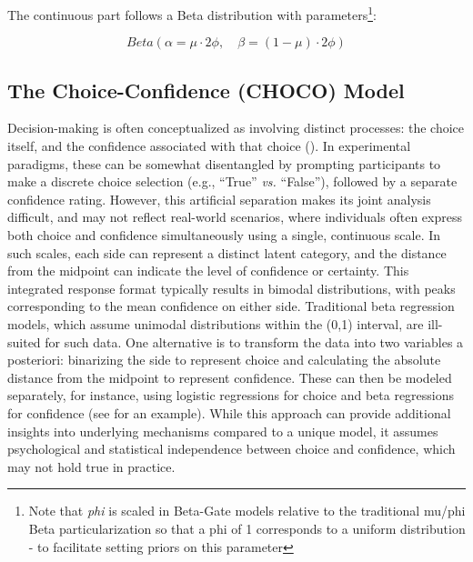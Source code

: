 \documentclass[
  jou,
  floatsintext,
  longtable,
  nolmodern,
  notxfonts,
  notimes,
  colorlinks=true,linkcolor=blue,citecolor=blue,urlcolor=blue]{apa7}
\begin{document}
The continuous part follows a Beta distribution with
parameters\footnote{Note that \emph{phi} is scaled in Beta-Gate models
  relative to the traditional mu/phi Beta particularization so that a
  phi of 1 corresponds to a uniform distribution - to facilitate setting
  priors on this parameter}:

\[
Beta(\alpha = \mu \cdot 2 \phi, \quad \beta = (1 - \mu) \cdot 2 \phi)
\]

\subsection{The Choice-Confidence (CHOCO)
Model}\label{the-choice-confidence-choco-model}

Decision-making is often conceptualized as involving distinct processes:
the choice itself, and the confidence associated with that choice
(). In
experimental paradigms, these can be somewhat disentangled by prompting
participants to make a discrete choice selection (e.g., ``True''
\emph{vs.} ``False''), followed by a separate confidence rating.
However, this artificial separation makes its joint analysis difficult,
and may not reflect real-world scenarios, where individuals often
express both choice and confidence simultaneously using a single,
continuous scale. In such scales, each side can represent a distinct
latent category, and the distance from the midpoint can indicate the
level of confidence or certainty. This integrated response format
typically results in bimodal distributions, with peaks corresponding to
the mean confidence on either side. Traditional beta regression models,
which assume unimodal distributions within the (0,1) interval, are
ill-suited for such data. One alternative is to transform the data into
two variables a posteriori: binarizing the side to represent choice and
calculating the absolute distance from the midpoint to represent
confidence. These can then be modeled separately, for instance, using
logistic regressions for choice and beta regressions for confidence (see
 for an
example). While this approach can provide additional insights into
underlying mechanisms compared to a unique model, it assumes
psychological and statistical independence between choice and
confidence, which may not hold true in practice.
\end{document}
